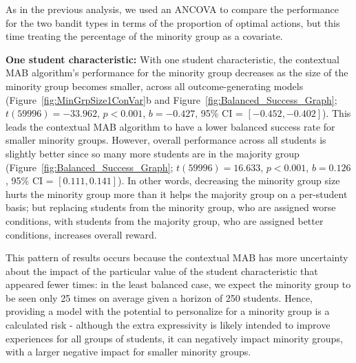 

As in the previous analysis, we used an ANCOVA to compare the performance for the two bandit types in terms of the proportion of optimal actions, but this time treating the percentage of the minority group as a covariate. 


\textbf{One student characteristic:} With one student characteristic, the contextual MAB algorithm's performance for the minority group decreases as the size of the minority group becomes smaller, across all outcome-generating models (Figure~\ref{fig:MinGrpSize1ConVar}b and Figure~\ref{fig:Balanced_Success_Graph}; $t(59996)=-33.962$, $p<0.001$, $b=-0.427$, 95\% CI = $[-0.452, -0.402]$).
This leads the contextual MAB algorithm to have a lower balanced success rate for smaller minority groups. However, overall performance across all students is slightly better since so many more students are in the majority group (Figure~\ref{fig:Balanced_Success_Graph}; $t(59996)=16.633$, $p<0.001$, $b=0.126$, 95\% CI = $[0.111, 0.141]$). In other words, decreasing the minority group size hurts the minority group more than it helps the majority group on a per-student basis; but replacing students from the minority group, who are assigned worse conditions, with students from the majority group, who are assigned better conditions, increases overall reward.  

This pattern of results occurs because the contextual MAB has more uncertainty about the impact of the particular value of the student characteristic that appeared fewer times: in the least balanced case, we expect the minority group to be seen only 25 times on average given a horizon of 250 students. Hence, providing a model with the potential to personalize for a minority group is a calculated risk - although the extra expressivity is likely intended to improve experiences for all groups of students, it can negatively impact minority groups, with a larger negative impact for smaller minority groups.

